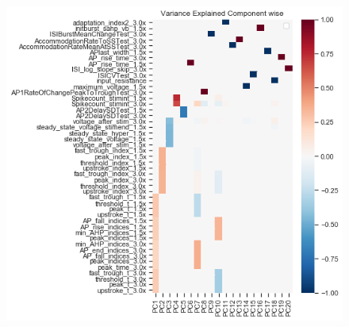 \begin{figure}    
    \begin{center}
    \includegraphics[scale=0.75]{figures/cortical_model_data_agreement_54_1.png}
    \caption[Component Loadings used to make Eigen Vectors of sparse PCA]{}
    
    
    
    \end{center}
\end{figure}    
\cite{wang2019sag}

